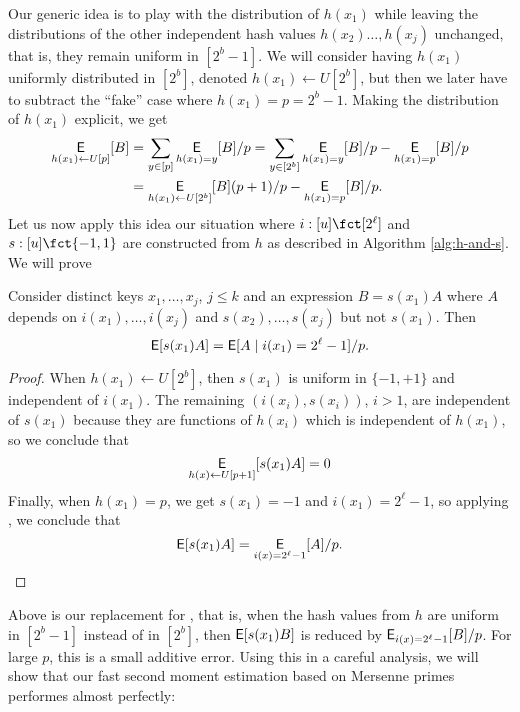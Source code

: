 Our generic idea is to play with the distribution of $h(x_1)$ while
leaving the distributions of the other independent hash values
$h(x_2)\ldots,h(x_j)$ unchanged, that is, they remain uniform in
$[2^b-1]$. We will consider having $h(x_1)$ uniformly distributed in
$[2^b]$, denoted $h(x_1)\gets U[2^b]$, but then we later have to
subtract the ``fake'' case where $h(x_1)=p=2^b-1$.  Making the
distribution of $h(x_1)$ explicit, we get
  \begin{align}
  \operatorname*{\sf{E}}_{h(x_1)\gets U[p]}[B]&=\sum_{y\in[p]}\operatorname*{\sf{E}}_{h(x_1)=y}[B]/p
  =\sum_{y\in[2^b]}\operatorname*{\sf{E}}_{h(x_1)=y}[B]/p-\operatorname*{\sf{E}}_{h(x_1)=p}[B]/p\nonumber\\
  &=\operatorname*{\sf{E}}_{h(x_1)\gets U[2^b]}[B](p+1)/p-\operatorname*{\sf{E}}_{h(x_1)=p}[B]/p.\label{eq:play-with-dist}
\end{align}
Let us now apply this idea our situation where $i:[u]\fct[2^\ell]$ and
$s:[u]\fct\{-1,1\}$ are constructed from $h$ as described in Algorithm
\ref{alg:h-and-s}. We will prove
\begin{lemma}\label{lem:remove-si}  Consider distinct keys $x_1,\ldots,x_j$, $j\leq k$ and an expression $B=s(x_1)A$ where $A$
depends on $i(x_1),\ldots,i(x_j)$ and $s(x_2),\ldots,s(x_j)$ but not
$s(x_1)$. Then
\begin{equation}\label{eq:remove-si}
  \operatorname*{\sf{E}}[s(x_1)A]=\operatorname*{\sf{E}}[A\mid i(x_1)=2^\ell-1]/p.
\end{equation}
\end{lemma}
\begin{proof}
When $h(x_1)\gets U[2^b]$, then $s(x_1)$ is uniform
in $\{-1,+1\}$ and independent of $i(x_1)$. The remaining
$(i(x_i),s(x_i))$, $i>1$, are independent of $s(x_1)$ because they
are functions of $h(x_i)$ which is independent of $h(x_1)$, so
we conclude that 
\[\operatorname*{\sf{E}}_{h(x)\gets U[p+1]}[s(x_1)A]=0\]
Finally, when $h(x_1)=p$, we get $s(x_1)=-1$ and $i(x_1)=2^\ell-1$, 
so applying , we conclude
that 
\[\operatorname*{\sf{E}}[s(x_1)A]=\operatorname*{\sf{E}}_{i(x)=2^\ell-1}[A]/p.\]
\end{proof}
Above  is our replacement for , that is,
when the hash values from $h$ are uniform in $[2^b-1]$ instead of
in $[2^b]$, then $\operatorname*{\sf{E}}[s(x_1)B]$ is reduced by $\operatorname*{\sf{E}}_{i(x)=2^\ell-1}[B]/p$.
For large $p$, this is a small additive error. Using this in a careful
analysis, we will show that our fast second moment estimation 
based on Mersenne primes performes almost perfectly:

